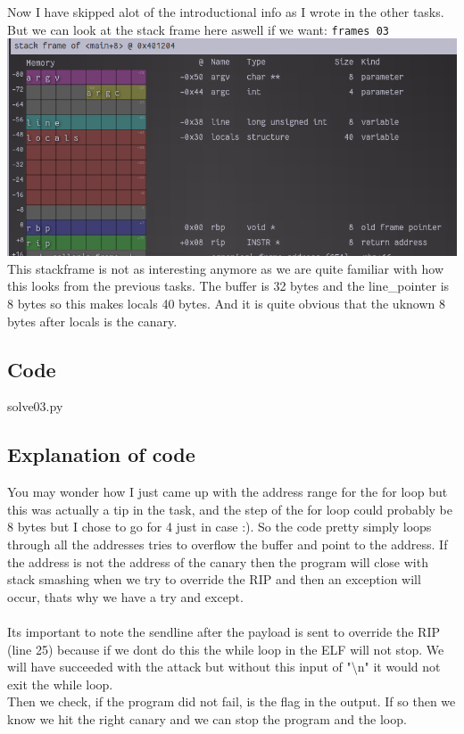 \documentclass{article}
\begin{document}
\\ \\
Now I have skipped alot of the introductional info as I wrote in the other tasks. But we can look at the stack frame here aswell if we want: \lstinline{frames 03} \\
\includegraphics[scale=0.5]{stackframe-03.png} \\
This stackframe is not as interesting anymore as we are quite familiar with how this looks from the previous tasks. The buffer is 32 bytes and the line\_pointer is 8 bytes so this makes locals 40 bytes. And it is quite obvious that the uknown 8 bytes after locals is the canary.
\subsection{Code}

{solve03.py}
\subsection{Explanation of code}
You may wonder how I just came up with the address range for the for loop but this was actually a tip in the task, and the step of the for loop could probably be 8 bytes but I chose to go for 4 just in case :). So the code pretty simply loops through all the addresses tries to overflow the buffer and point to the address. If the address is not the address of the canary then the program will close with stack smashing when we try to override the RIP and then an exception will occur, thats why we have a try and except.\\ \\
Its important to note the sendline after the payload is sent to override the RIP (line 25) because if we dont do this the while loop in the ELF will not stop. We will have succeeded with the attack but without this input of "\textbackslash n" it would not exit the while loop. \\
Then we check, if the program did not fail, is the flag in the output. If so then we know we hit the right canary and we can stop the program and the loop.
\end{document}
